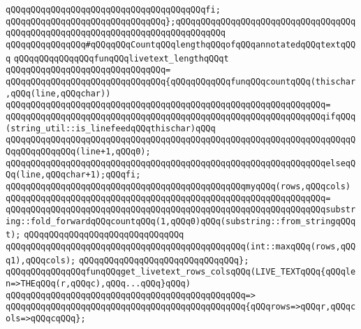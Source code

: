 \verb|qQQqqQQqqQQqqQQqqQQqqQQqqQQqqQQqqQQqqQQqfi;|\newline
\verb|qQQqqQQqqQQqqQQqqQQqqQQqqQQqqQQq};qQQqqQQqqQQqqQQqqQQqqQQqqQQqqQQqqQQqqQQqqQQqqQQqqQQqqQQqqQQqqQQqqQQqqQQqqQQqqQQq|\newline
\newline
\verb|qQQqqQQqqQQqqQQq#qQQqqQQqCountqQQqlengthqQQqofqQQqannotatedqQQqtextqQQq|\newline
\verb|qQQqqQQqqQQqqQQqfunqQQqlivetext_lengthqQQqt|\newline
\verb|qQQqqQQqqQQqqQQqqQQqqQQqqQQqqQQq=|\newline
\verb|qQQqqQQqqQQqqQQqqQQqqQQqqQQqqQQq{qQQqqQQqqQQqfunqQQqcountqQQq(thischar,qQQq(line,qQQqchar))|\newline
\verb|qQQqqQQqqQQqqQQqqQQqqQQqqQQqqQQqqQQqqQQqqQQqqQQqqQQqqQQqqQQqqQQq=|\newline
\verb|qQQqqQQqqQQqqQQqqQQqqQQqqQQqqQQqqQQqqQQqqQQqqQQqqQQqqQQqqQQqqQQqifqQQq(string_util::is_linefeedqQQqthischar)qQQq|\newline
\verb|qQQqqQQqqQQqqQQqqQQqqQQqqQQqqQQqqQQqqQQqqQQqqQQqqQQqqQQqqQQqqQQqqQQqqQQqqQQqqQQqqQQq(line+1,qQQq0);|\newline
\verb|qQQqqQQqqQQqqQQqqQQqqQQqqQQqqQQqqQQqqQQqqQQqqQQqqQQqqQQqqQQqqQQqelseqQQq(line,qQQqchar+1);qQQqfi;|\newline
\newline
\verb|qQQqqQQqqQQqqQQqqQQqqQQqqQQqqQQqqQQqqQQqqQQqqQQqmyqQQq(rows,qQQqcols)|\newline
\verb|qQQqqQQqqQQqqQQqqQQqqQQqqQQqqQQqqQQqqQQqqQQqqQQqqQQqqQQqqQQqqQQq=|\newline
\verb|qQQqqQQqqQQqqQQqqQQqqQQqqQQqqQQqqQQqqQQqqQQqqQQqqQQqqQQqqQQqqQQqsubstring::fold_forwardqQQqcountqQQq(1,qQQq0)qQQq(substring::from_stringqQQqt);|\newline
\verb|qQQqqQQqqQQqqQQqqQQqqQQqqQQqqQQq|\newline
\verb|qQQqqQQqqQQqqQQqqQQqqQQqqQQqqQQqqQQqqQQqqQQqqQQq(int::maxqQQq(rows,qQQq1),qQQqcols);|\newline
\verb|qQQqqQQqqQQqqQQqqQQqqQQqqQQqqQQq};|\newline
\newline
\verb|qQQqqQQqqQQqqQQqfunqQQqget_livetext_rows_colsqQQq(LIVE_TEXTqQQq{qQQqlen=>THEqQQq(r,qQQqc),qQQq...qQQq}qQQq)|\newline
\verb|qQQqqQQqqQQqqQQqqQQqqQQqqQQqqQQqqQQqqQQqqQQqqQQq=>|\newline
\verb|qQQqqQQqqQQqqQQqqQQqqQQqqQQqqQQqqQQqqQQqqQQqqQQq{qQQqrows=>qQQqr,qQQqcols=>qQQqcqQQq};|\newline
